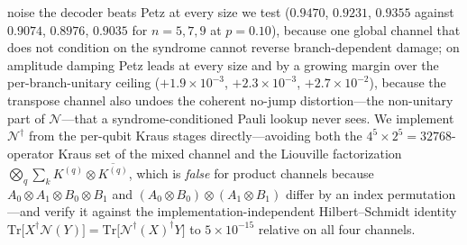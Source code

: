 \documentclass[aps,prxquantum,reprint,superscriptaddress]{revtex4-2}
\newcommand{\tr}{\mathrm{Tr}}
\begin{document}
noise the decoder beats Petz at every size we test ($0.9470$, $0.9231$, $0.9355$
against $0.9074$, $0.8976$, $0.9035$ for $n=5,7,9$ at $p=0.10$), because one
global channel that does not condition on the syndrome cannot reverse
branch-dependent damage; on amplitude damping Petz leads at every size and by a
growing margin over the per-branch-unitary ceiling ($+1.9\times10^{-3}$,
$+2.3\times10^{-3}$, $+2.7\times10^{-2}$), because the transpose channel also
undoes the coherent no-jump distortion---the non-unitary part of
$\mathcal N$---that a syndrome-conditioned Pauli lookup never sees. We implement
$\mathcal N^\dagger$ from the per-qubit Kraus stages directly---avoiding both the
$4^5\!\times\!2^5=32768$-operator Kraus set of the mixed channel and the
Liouville factorization $\bigotimes_q\sum_k K^{(q)}\!\otimes\!\overline{K^{(q)}}$,
which is \emph{false} for product channels because
$A_0\!\otimes\!A_1\!\otimes\!B_0\!\otimes\!B_1$ and
$(A_0\!\otimes\!B_0)\!\otimes\!(A_1\!\otimes\!B_1)$ differ by an index
permutation---and verify it against the implementation-independent
Hilbert--Schmidt identity
$\tr\!\big[X^\dagger\mathcal N(Y)\big]=\tr\!\big[\mathcal N^\dagger(X)^\dagger
Y\big]$ to $5\times10^{-15}$ relative on all four channels.
\end{document}
